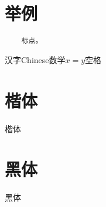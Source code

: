 \documentclass[11pt]{article}
\begin{document}
    \section{举例}
    \begin{verbatim}           
    标点。                              
    \end{verbatim}
    
    汉字Chinese数学$x=y$空格
    
    \section{楷体}  
    
    \kai 楷体
    
    \section{黑体}  
    
    \hei 黑体
    
    
\end{document}

